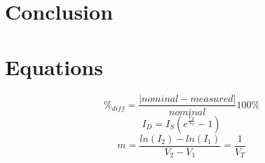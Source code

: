 \documentclass{article}
\begin{document}
\section{Conclusion}
\label{sec:conclusion}


\section{Equations}
\label{sec:equations}

%
\begin{equation}
  \label{eq:percent_diff}
  \%_{diff} = \frac{|nominal - measured|}{nominal}100\%
\end{equation}
%
\begin{equation}
  \label{eq:schockley}
  I_D = I_S \left(e^{\frac{V_D}{V_T}} - 1\right)
\end{equation}
%
  \begin{equation}
  \label{eq:m}
    m = \frac{ln(I_2)-ln(I_1)}{V_2-V_1} = \frac{1}{V_T}
\end{equation}
\end{document}
